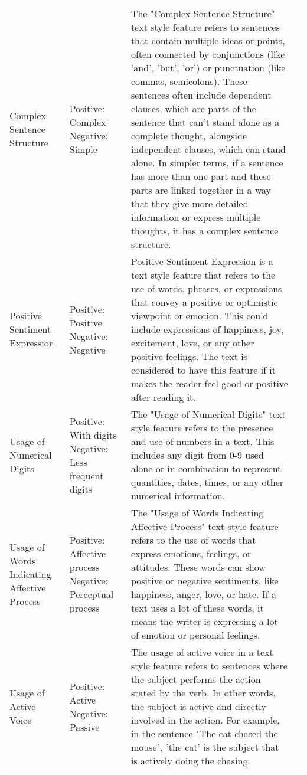{{\begin{longtable}{p{3cm} p{3cm} p{6.5cm} p{2cm}}
Complex Sentence Structure & Positive: Complex \newline Negative: Simple & The "Complex Sentence Structure" text style feature refers to sentences that contain multiple ideas or points, often connected by conjunctions (like 'and', 'but', 'or') or punctuation (like commas, semicolons). These sentences often include dependent clauses, which are parts of the sentence that can't stand alone as a complete thought, alongside independent clauses, which can stand alone. In simpler terms, if a sentence has more than one part and these parts are linked together in a way that they give more detailed information or express multiple thoughts, it has a complex sentence structure. & \\
Positive Sentiment Expression & Positive: Positive \newline Negative: Negative & Positive Sentiment Expression is a text style feature that refers to the use of words, phrases, or expressions that convey a positive or optimistic viewpoint or emotion. This could include expressions of happiness, joy, excitement, love, or any other positive feelings. The text is considered to have this feature if it makes the reader feel good or positive after reading it. & \\
Usage of Numerical Digits & Positive: With digits \newline Negative: Less frequent digits & The "Usage of Numerical Digits" text style feature refers to the presence and use of numbers in a text. This includes any digit from 0-9 used alone or in combination to represent quantities, dates, times, or any other numerical information. & \\
Usage of Words Indicating Affective Process & Positive: Affective process \newline Negative: Perceptual process & The "Usage of Words Indicating Affective Process" text style feature refers to the use of words that express emotions, feelings, or attitudes. These words can show positive or negative sentiments, like happiness, anger, love, or hate. If a text uses a lot of these words, it means the writer is expressing a lot of emotion or personal feelings. & \\
Usage of Active Voice & Positive: Active \newline Negative: Passive & The usage of active voice in a text style feature refers to sentences where the subject performs the action stated by the verb. In other words, the subject is active and directly involved in the action. For example, in the sentence "The cat chased the mouse", 'the cat' is the subject that is actively doing the chasing. & \\

\end{longtable}}}
